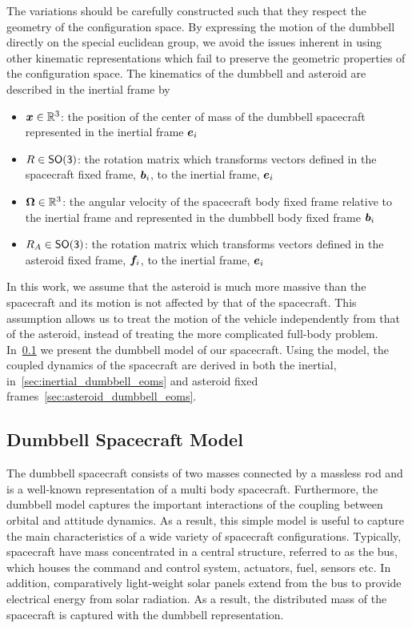 The variations should be carefully constructed such that they respect the geometry of the configuration space.
By expressing the motion of the dumbbell directly on the special euclidean group, we avoid the issues inherent in using other kinematic representations which fail to preserve the geometric properties of the configuration space.
The kinematics of the dumbbell and asteroid are described in the inertial frame by
\begin{itemize}
    \item \( \bm{x} \in \mathbb{R}^3 \): the position of the center of mass of the dumbbell spacecraft represented in the inertial frame \( \bm{e}_i\)
    \item \( R \in \mathsf{SO(3)}\): the rotation matrix which transforms vectors defined in the spacecraft fixed frame, \( \bm{b}_i \), to the inertial frame, \( \bm{e}_i \)
    \item \( \bm{\Omega} \in \mathbb{R}^3 \): the angular velocity of the spacecraft body fixed frame relative to the inertial frame and represented in the dumbbell body fixed frame \( \bm{b}_i \)
    \item \( R_A \in \mathsf{SO(3)} \): the rotation matrix which transforms vectors defined in the asteroid fixed frame, \( \bm{f}_i \), to the inertial frame, \( \bm{e}_i \)
\end{itemize}
In this work, we assume that the asteroid is much more massive than the spacecraft and its motion is not affected by that of the spacecraft.
This assumption allows us to treat the motion of the vehicle independently from that of the asteroid, instead of treating the more complicated full-body problem. 
In~\cref{sec:dumbbell_model} we present the dumbbell model of our spacecraft.
Using the model, the coupled dynamics of the spacecraft are derived in both the inertial, in~\cref{sec:inertial_dumbbell_eoms} and asteroid fixed frames~\cref{sec:asteroid_dumbbell_eoms}.

\subsection{Dumbbell Spacecraft Model}\label{sec:dumbbell_model}

The dumbbell spacecraft consists of two masses connected by a massless rod and is a well-known representation of a multi body spacecraft.
Furthermore, the dumbbell model captures the important interactions of the coupling between orbital and attitude dynamics. 
As a result, this simple model is useful to capture the main characteristics of a wide variety of spacecraft configurations.
Typically, spacecraft have mass concentrated in a central structure, referred to as the bus, which houses the command and control system, actuators, fuel, sensors etc. 
In addition, comparatively light-weight solar panels extend from the bus to provide electrical energy from solar radiation. 
As a result, the distributed mass of the spacecraft is captured with the dumbbell representation.

